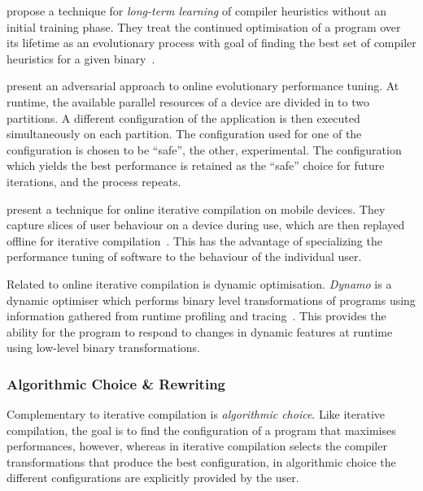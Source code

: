 \citeauthor{Tartara2013} propose a technique for \emph{long-term learning} of compiler heuristics without an initial training phase. They treat the continued optimisation of a program over its lifetime as an evolutionary process with goal of finding the best set of compiler heuristics for a given binary~\cite{Tartara2013}.

\citeauthor{Ansel2012} present an adversarial approach to online evolutionary performance tuning. At runtime, the available parallel resources of a device are divided in to two partitions. A different configuration of the application is then executed simultaneously on each partition. The configuration used for one of the configuration is chosen to be ``safe'', the other, experimental. The configuration which yields the best performance is retained as the ``safe'' choice for future iterations, and the process repeats.

\citeauthor{Mpeis2015} present a technique for online iterative compilation on mobile devices. They capture slices of user behaviour on a device during use, which are then replayed offline for iterative compilation~\cite{Mpeis2015}. This has the advantage of specializing the performance tuning of software to the behaviour of the individual user.

Related to online iterative compilation is dynamic optimisation. \emph{Dynamo} is a dynamic optimiser which performs binary level transformations of programs using information gathered from runtime profiling and tracing~\cite{Bala2000}. This provides the ability for the program to respond to changes in dynamic features at runtime using low-level binary transformations.


\subsubsection{Algorithmic Choice \& Rewriting}

Complementary to iterative compilation is \emph{algorithmic choice}. Like iterative compilation, the goal is to find the configuration of a program that maximises performances, however, whereas in iterative compilation selects the compiler transformations that produce the best configuration, in algorithmic choice the different configurations are explicitly provided by the user.

